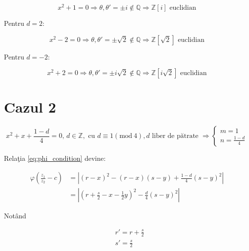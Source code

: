 \documentclass[12pt]{article}
\begin{document}
\begin{equation*}
    x^2 + 1 = 0 \Rightarrow \theta, \theta' = \pm i \notin \mathbb{Q} \Rightarrow \boxed{\mathbb{Z}[i] \text{ euclidian}}
\end{equation*}

Pentru $d = 2$:

\begin{equation*}
    x^2 - 2 = 0 \Rightarrow \theta, \theta' = \pm \sqrt{2} \notin \mathbb{Q} \Rightarrow \boxed{\mathbb{Z}[\sqrt{2}] \text{ euclidian}}
\end{equation*}

Pentru $d = -2$:

\begin{equation*}
    x^2 + 2 = 0 \Rightarrow \theta, \theta' = \pm i\sqrt{2} \notin \mathbb{Q} \Rightarrow \boxed{\mathbb{Z}[i\sqrt{2}] \text{ euclidian}}
\end{equation*}

\section*{Cazul 2} 
\begin{equation} \label{eq:case_2}
x^2 + x + \frac{1 - d}{4} = 0, \, d \in \mathbb{Z},
\text{ cu } d \equiv 1 (\text{mod}\ 4), d \text{ liber de pătrate }
\Rightarrow \begin{cases} m = 1 \\ n = \frac{1-d}{4} \end{cases}
\end{equation}

Relaţia \eqref{eq:phi_condition} devine:

\begin{equation} \label{eq:phi_condition_case2}
\begin{split}
    \varphi \left(\frac{z_1}{z_2} - c\right)  &= \left| (r-x)^2 - (r-x)(s-y) + \frac{1-d}{4}(s-y)^2 \right| \\
    &= \left| \left(r + \frac{s}{2} - x - \frac{1}{2}y\right)^2 - \frac{d}{4}(s-y)^2 \right|
\end{split}
\end{equation}

Notând

\begin{equation*}
\begin{split}
    & r' = r + \frac{s}{2} \\
    & s' = \frac{s}{2}
\end{split}
\end{equation*}
\end{document}

